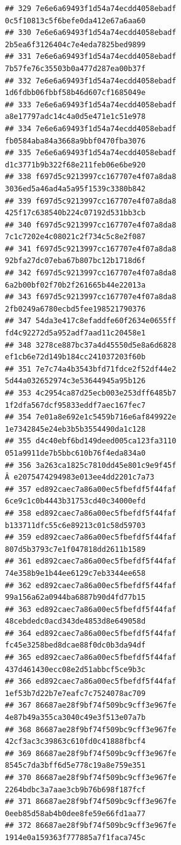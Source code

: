 \documentclass[]{article}
\begin{document}
\begin{verbatim}
## 329 7e6e6a69493f1d54a74ecdd4058ebadf   0c5f10813c5f6befe0da412e67a6aa60
## 330 7e6e6a69493f1d54a74ecdd4058ebadf   2b5ea6f3126404c7e4eda7825bed9899
## 331 7e6e6a69493f1d54a74ecdd4058ebadf   7b57fe76c35503b0a477d287ea00b37f
## 332 7e6e6a69493f1d54a74ecdd4058ebadf   1d6fdbb06fbbf58b46d607cf1685049e
## 333 7e6e6a69493f1d54a74ecdd4058ebadf   a8e17797adc14c4a0d5e471e1c51e978
## 334 7e6e6a69493f1d54a74ecdd4058ebadf   fb0584aba84a3668a9bbf0470fba3076
## 335 7e6e6a69493f1d54a74ecdd4058ebadf   d1c3771b9b322f68e211feb06e6be920
## 338 f697d5c9213997cc167707e4f07a8da8   3036ed5a46ad4a5a95f1539c3380b842
## 339 f697d5c9213997cc167707e4f07a8da8   425f17c638540b224c07192d531bb3cb
## 340 f697d5c9213997cc167707e4f07a8da8   7c1c7202e4c08021c2f734c5c8e2f087
## 341 f697d5c9213997cc167707e4f07a8da8   92bfa27dc07eba67b807bc12b1718d6f
## 342 f697d5c9213997cc167707e4f07a8da8   6a2b00bf02f70b2f261665b44e22013a
## 343 f697d5c9213997cc167707e4f07a8da8   2fb0249a6780ecbd5fee198521790376
## 347 54da3e417c8efaddfe60f2634e0655ff   fd4c92272d5a952adf7aad11c20458e1
## 348 3278ce887bc37a4d45550d5e8a6d6828   ef1cb6e72d149b184cc241037203f60b
## 351 7e7c74a4b3543bfd71fdce2f52df44e2   5d44a032652974c3e53644945a95b126
## 353 4c2954ca87d25ecb003e253dff6485b7   1f2dfa567dcf95833eddf7aec167fec7
## 354 7e01a8e692e1c5459b716e6af849922e   1e7342845e24eb3b5b3554490da1c128
## 355 d4c40ebf6bd149deed005ca123fa3110   051a9911de7b5bbc610b76f4eda834a0
## 356 3a263ca1825c7810dd45e801c9e9f45f Â e2075474294983e013ee4dd2201c7a73
## 357 ed892caec7a86a00ec5fbefdf5f44faf   6ce9c1c0b4443b31753cd40c34000efd
## 358 ed892caec7a86a00ec5fbefdf5f44faf   b133711dfc55c6e89213c01c58d59703
## 359 ed892caec7a86a00ec5fbefdf5f44faf   807d5b3793c7e1f047818dd2611b1589
## 361 ed892caec7a86a00ec5fbefdf5f44faf   74e358b9e1b44ee6129c7eb3344ee658
## 362 ed892caec7a86a00ec5fbefdf5f44faf   99a156a62a0944ba6887b90d4fd77b15
## 363 ed892caec7a86a00ec5fbefdf5f44faf   48cebdedc0acd343de4853d8e649058d
## 364 ed892caec7a86a00ec5fbefdf5f44faf   fc45e3258bed8dcae88f0dc0b3da94df
## 365 ed892caec7a86a00ec5fbefdf5f44faf   437d461430ecc08e2d51abbcf5ce9b3c
## 366 ed892caec7a86a00ec5fbefdf5f44faf   1ef53b7d22b7e7eafc7c7524078ac709
## 367 86687ae28f9bf74f509bc9cff3e967fe   4e87b49a355ca3040c49e3f513e07a7b
## 368 86687ae28f9bf74f509bc9cff3e967fe   42cf3ac3c39863c610fd0c41888fbcf4
## 369 86687ae28f9bf74f509bc9cff3e967fe   8545c7da3bff6d5e778c19a8e759e351
## 370 86687ae28f9bf74f509bc9cff3e967fe   2264bdbc3a7aae3cb9b76b698f187fcf
## 371 86687ae28f9bf74f509bc9cff3e967fe   0eeb85d58ab4b0dee8fe59e66fd1aa77
## 372 86687ae28f9bf74f509bc9cff3e967fe   1914e0a159363f777885a7f1faca745c

\end{verbatim}
\end{document}
